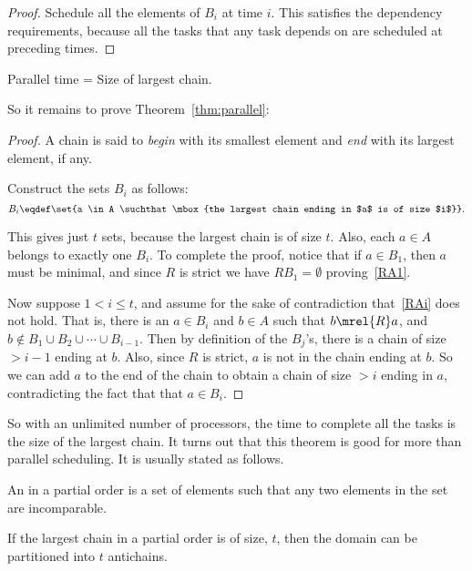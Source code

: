 \begin{proof}
Schedule all the elements of $B_i$ at time $i$.  This satisfies the
dependency requirements, because all the tasks that any task depends on
are scheduled at preceding times.
\end{proof}

\begin{corollary}
Parallel time = Size of largest chain.
\end{corollary}

So it remains to prove Theorem~\ref{thm:parallel}:
\begin{proof}
A chain is said to \emph{begin} with its smallest element and \emph{end}
with its largest element, if any.

Construct the sets $B_i$ as follows:
\[
B_i \eqdef \set{a \in A \suchthat \mbox{the largest chain ending in $a$ is of
    size $i$}}.
\]

This gives just $t$ sets, because the largest chain is of size $t$.  Also,
each $a \in A$ belongs to exactly one $B_i$.  To complete the proof,
notice that if $a \in B_1$, then $a$ must be minimal, and since $R$ is
strict we have $RB_1 = \emptyset$ proving~\eqref{RA1}.

Now suppose $1 <i \le t$, and assume for the sake of contradiction
that~\eqref{RAi} does not hold.  That is, there is an $a \in B_i$ and $b
\in A$ such that $b \mrel{R} a$, and $b \notin B_1 \cup B_2 \cup \cdots
\cup B_{i-1}$.  Then by definition of the $B_j$'s, there is a chain of
size $> i-1$ ending at $b$.  Also, since $R$ is strict, $a$ is not in the
chain ending at $b$.  So we can add $a$ to the end of the chain to obtain
a chain of size $>i$ ending in $a$, contradicting the fact that that $a
\in B_i$.
\end{proof}

So with an unlimited number of processors, the time to complete all the
tasks is the size of the largest chain.  It turns out that this theorem
is good for more than parallel scheduling.  It is usually stated as
follows.

\begin{definition}
An  in a partial order is a set of elements such that any
two elements in the set are incomparable.
\end{definition}

\begin{corollary}\label{cor:parallel}
If the largest chain in a partial order is of size, $t$, then the domain
can be partitioned into $t$ antichains.
\end{corollary}

